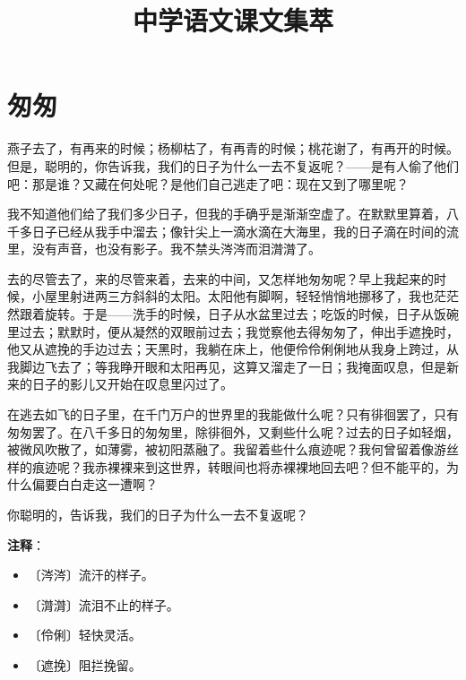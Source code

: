 \documentclass[12pt,UTF-8,openany]{ctexbook}
\title{\zihao{0} \bfseries 中学语文课文集萃}
\author{}
\date{}
\begin{document}
\maketitle
\tableofcontents
\newpage

\chapter{匆匆}

\begin{large}
    
    燕子去了，有再来的时候；杨柳枯了，有再青的时候；桃花谢了，有再开的时候。但是，聪明的，你告诉我，我们的日子为什么一去不复返呢？——是有人偷了他们吧：那是谁？又藏在何处呢？是他们自己逃走了吧：现在又到了哪里呢？
    
    我不知道他们给了我们多少日子，但我的手确乎是渐渐空虚了。在默默里算着，八千多日子已经从我手中溜去；像针尖上一滴水滴在大海里，我的日子滴在时间的流里，没有声音，也没有影子。我不禁头涔涔而泪潸潸了。
    
    去的尽管去了，来的尽管来着，去来的中间，又怎样地匆匆呢？早上我起来的时候，小屋里射进两三方斜斜的太阳。太阳他有脚啊，轻轻悄悄地挪移了，我也茫茫然跟着旋转。于是——洗手的时候，日子从水盆里过去；吃饭的时候，日子从饭碗里过去；默默时，便从凝然的双眼前过去；我觉察他去得匆匆了，伸出手遮挽时，他又从遮挽的手边过去；天黑时，我躺在床上，他便伶伶俐俐地从我身上跨过，从我脚边飞去了；等我睁开眼和太阳再见，这算又溜走了一日；我掩面叹息，但是新来的日子的影儿又开始在叹息里闪过了。
    
    在逃去如飞的日子里，在千门万户的世界里的我能做什么呢？只有徘徊罢了，只有匆匆罢了。在八千多日的匆匆里，除徘徊外，又剩些什么呢？过去的日子如轻烟，被微风吹散了，如薄雾，被初阳蒸融了。我留着些什么痕迹呢？我何曾留着像游丝样的痕迹呢？我赤裸裸来到这世界，转眼间也将赤裸裸地回去吧？但不能平的，为什么偏要白白走这一遭啊？
    
    你聪明的，告诉我，我们的日子为什么一去不复返呢？
    
\end{large}


\newpage

\textbf{注释}：

\vspace{-1em}

\begin{itemize}
    \setlength\itemsep{-0.2em}
    \item 〔涔涔〕流汗的样子。
    \item 〔潸潸〕流泪不止的样子。
    \item 〔伶俐〕轻快灵活。
    \item 〔遮挽〕阻拦挽留。
\end{itemize}
\end{document}
